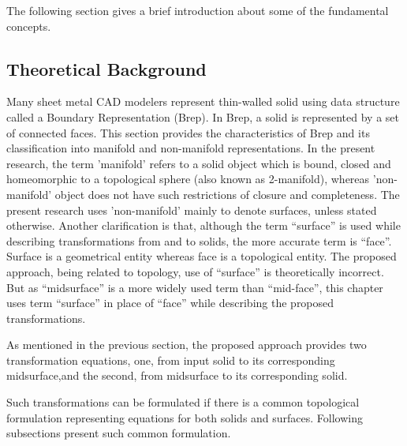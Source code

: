 The following section gives a brief introduction about some of the fundamental concepts.

\subsection{Theoretical Background}\label{sec:topoval:preliminaries}

Many sheet metal CAD modelers represent thin-walled solid using data structure called a Boundary Representation (Brep). In Brep, a solid is represented by a set of connected faces. This section provides the characteristics of Brep and its classification into manifold and non-manifold representations. In the present research, the term 'manifold' refers to a solid object which is bound, closed and homeomorphic to a topological sphere (also known as 2-manifold), whereas 'non-manifold' object does not have such restrictions of closure and completeness. The present research uses 'non-manifold' mainly to denote surfaces, unless stated otherwise. Another clarification is that, although the term ``surface'' is used while describing transformations from and to solids, the more accurate term is ``face''. Surface is a geometrical entity whereas face is a topological entity. The proposed approach, being related to topology, use of ``surface'' is theoretically incorrect. But as ``midsurface'' is a more widely used term than ``mid-face'', this chapter uses term ``surface'' in place of ``face'' while describing the proposed transformations.

As mentioned in the previous section, the proposed approach provides two transformation equations, one, from input solid to its corresponding midsurface,and the second, from midsurface to its corresponding solid.

Such transformations can be formulated if there is a common topological formulation representing equations for both solids and surfaces. Following subsections present such common formulation.

